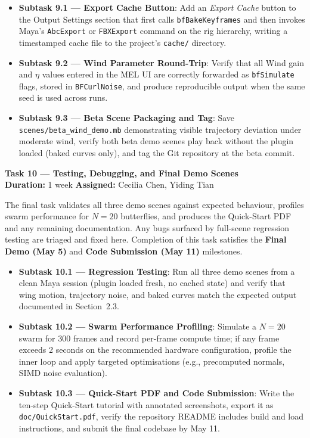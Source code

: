 \documentclass[12pt]{article}
\begin{document}
\begin{itemize}
  \item \textbf{Subtask 9.1 --- Export Cache Button}: Add an \textit{Export Cache}
    button to the Output Settings section that first calls \texttt{bfBakeKeyframes}
    and then invokes Maya's \texttt{AbcExport} or \texttt{FBXExport} command on the
    rig hierarchy, writing a timestamped cache file to the project's
    \texttt{cache/} directory.
  \item \textbf{Subtask 9.2 --- Wind Parameter Round-Trip}: Verify that all Wind
    gain and $\eta$ values entered in the MEL UI are correctly forwarded as
    \texttt{bfSimulate} flags, stored in \texttt{BFCurlNoise}, and produce
    reproducible output when the same seed is used across runs.
  \item \textbf{Subtask 9.3 --- Beta Scene Packaging and Tag}: Save
    \texttt{scenes/beta\_wind\_demo.mb} demonstrating visible trajectory deviation
    under moderate wind, verify both beta demo scenes play back without the plugin
    loaded (baked curves only), and tag the Git repository at the beta commit.
\end{itemize}

\bigskip
\noindent\textbf{Task 10 --- Testing, Debugging, and Final Demo Scenes}\\
\textbf{Duration:} 1 week \quad \textbf{Assigned:} Cecilia Chen, Yiding Tian

The final task validates all three demo scenes against expected behaviour, profiles
swarm performance for $N=20$ butterflies, and produces the Quick-Start PDF and any
remaining documentation. Any bugs surfaced by full-scene regression testing are
triaged and fixed here. Completion of this task satisfies the \textbf{Final Demo
(May 5)} and \textbf{Code Submission (May 11)} milestones.

\begin{itemize}
  \item \textbf{Subtask 10.1 --- Regression Testing}: Run all three demo scenes
    from a clean Maya session (plugin loaded fresh, no cached state) and verify
    that wing motion, trajectory noise, and baked curves match the expected output
    documented in Section~2.3.
  \item \textbf{Subtask 10.2 --- Swarm Performance Profiling}: Simulate a
    $N=20$ swarm for 300 frames and record per-frame compute time; if any frame
    exceeds 2 seconds on the recommended hardware configuration, profile the inner
    loop and apply targeted optimisations (e.g., precomputed normals, SIMD noise
    evaluation).
  \item \textbf{Subtask 10.3 --- Quick-Start PDF and Code Submission}: Write the
    ten-step Quick-Start tutorial with annotated screenshots, export it as
    \texttt{doc/QuickStart.pdf}, verify the repository README includes build and
    load instructions, and submit the final codebase by May 11.
\end{itemize}
\end{document}
